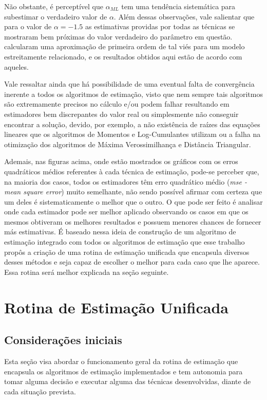Não obstante, é perceptível que 
$\alpha_{ML}$ tem uma tendência sistemática para subestimar o verdadeiro valor de $\alpha$. Além dessas observações, vale salientar que para o valor de $\alpha = -1.5$ as estimativas providas por todas as técnicas se mostraram bem próximas do valor verdadeiro do parâmetro em questão. \citet{FreryStochasticDistances2015} calcularam uma aproximação de primeira ordem de tal viés para um modelo estreitamente relacionado, e os resultados obtidos aqui estão de acordo com aqueles.

Vale ressaltar ainda que há possibilidade de uma eventual falta de convergência inerente a todos os algoritmos de estimação, visto que nem sempre tais algoritmos são extremamente precisos no cálculo e/ou podem falhar resultando em estimadores bem discrepantes do valor real ou simplesmente não conseguir encontrar a solução, devido, por exemplo, a não existência de raízes das equações lineares que os algoritmos de Momentos e Log-Cumulantes utilizam ou a falha na otimização dos algoritmos de Máxima Verossimilhança e Distância Triangular.

Ademais, nas figuras acima, onde estão mostrados os gráficos com os erros quadráticos médios referentes à cada técnica de estimação, pode-se perceber que, na maioria dos casos, todos os estimadores têm erro quadrático médio (\textit{mse - mean square error}) muito semelhante, não sendo possível afirmar com certeza que um deles é sistematicamente o melhor que o outro. O que pode ser feito é analisar onde cada estimador pode ser melhor aplicado observando os casos em que os mesmos obtiveram os melhores resultados e possuem menores chances de fornecer más estimativas. É baseado nessa ideia de construção de um algoritmo de estimação integrado com todos os algoritmos de estimação que esse trabalho propôs a criação de uma rotina de estimação unificada que encapsula diversos desses métodos e seja capaz de escolher o melhor para cada caso que lhe aparece. Essa rotina será melhor explicada na seção seguinte.

\section{Rotina de Estimação Unificada}

\subsection{Considerações iniciais}

Esta seção visa abordar o funcionamento geral da rotina de estimação que encapsula os algoritmos de estimação implementados e tem autonomia para tomar alguma decisão e executar alguma das técnicas desenvolvidas, diante de cada situação prevista. 

